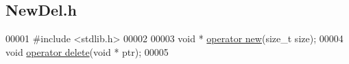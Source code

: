 \hypertarget{_new_del_8h_source}{
\subsection{NewDel.h}
}

\begin{DoxyCode}
00001 \textcolor{preprocessor}{#include <stdlib.h>}
00002 
00003 \textcolor{keywordtype}{void} * \hyperlink{_new_del_8h_a205ed048fdf5259c2e8e0cb60ee8f719}{operator new}(\textcolor{keywordtype}{size\_t} size);
00004 \textcolor{keywordtype}{void} \hyperlink{_new_del_8h_a3d97a7e2a0208075b4b37328c96ed390}{operator delete}(\textcolor{keywordtype}{void} * ptr); 
00005 
\end{DoxyCode}

